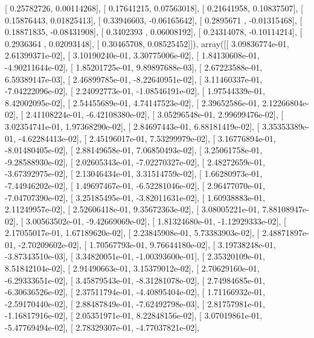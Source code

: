 \documentclass{article}
\begin{document}
       [ 0.25782726,  0.00114268],
       [ 0.17641215,  0.07563018],
       [ 0.21641958,  0.10837507],
       [ 0.15876443,  0.01825413],
       [ 0.33946603, -0.06165642],
       [ 0.2895671 , -0.01315468],
       [ 0.18871835, -0.08431908],
       [ 0.3402393 ,  0.06008192],
       [ 0.24314078, -0.10114214],
       [ 0.2936364 ,  0.02093148],
       [ 0.30465708,  0.08525452]]), array([[  3.09836774e-01,   2.61399371e-02],
       [  3.10190240e-01,   3.30775006e-02],
       [  1.84130608e-01,  -4.90211644e-02],
       [  1.85201725e-01,   9.89897688e-03],
       [  2.67223588e-01,   6.59389147e-03],
       [  2.46899785e-01,  -8.22640951e-02],
       [  3.11460337e-01,  -7.04222096e-02],
       [  2.24092773e-01,  -1.08546191e-02],
       [  1.97544339e-01,   8.42002095e-02],
       [  2.54455689e-01,   4.74147523e-02],
       [  2.39652586e-01,   2.12266804e-02],
       [  2.41108224e-01,  -6.42108380e-02],
       [  3.05296548e-01,   2.99699476e-02],
       [  3.02354741e-01,   1.97368290e-02],
       [  2.84697443e-01,   6.88181419e-02],
       [  3.35353389e-01,  -4.62284413e-02],
       [  2.45196017e-01,   7.53299979e-02],
       [  3.16776894e-01,  -8.01480405e-02],
       [  2.88149658e-01,   7.06850493e-02],
       [  3.25061758e-01,  -9.28588930e-02],
       [  2.02605343e-01,  -7.02270327e-02],
       [  2.48272659e-01,  -3.67392975e-02],
       [  2.13046434e-01,   3.31514759e-02],
       [  1.66280973e-01,  -7.44946202e-02],
       [  1.49697467e-01,  -6.52281046e-02],
       [  2.96477070e-01,  -7.04707390e-02],
       [  3.25185495e-01,  -3.82011631e-02],
       [  1.60938883e-01,   2.11249957e-02],
       [  2.52606418e-01,   9.35672363e-02],
       [  3.08005221e-01,   7.88108947e-02],
       [  3.00563502e-01,  -9.42669069e-02],
       [  1.81324680e-01,  -1.12929333e-02],
       [  2.17055017e-01,   1.67189620e-02],
       [  2.23845908e-01,   5.73383903e-02],
       [  2.48871897e-01,  -2.70209602e-02],
       [  1.70567793e-01,   9.76644180e-02],
       [  3.19738248e-01,  -3.87343510e-03],
       [  3.34820051e-01,  -1.00393600e-01],
       [  2.35320109e-01,   8.51842104e-02],
       [  2.91490663e-01,   3.15379012e-02],
       [  2.70629160e-01,  -6.29333651e-02],
       [  3.45879543e-01,  -8.31281078e-02],
       [  2.74984685e-01,  -6.30636526e-02],
       [  2.37511794e-01,  -4.40895404e-02],
       [  1.71166932e-01,  -2.59170440e-02],
       [  2.88487849e-01,  -7.62492798e-03],
       [  2.81757981e-01,  -1.16817916e-02],
       [  2.05351971e-01,   8.22848156e-02],
       [  3.07019861e-01,  -5.47769494e-02],
       [  2.78329307e-01,  -4.77037821e-02],
\end{document}
